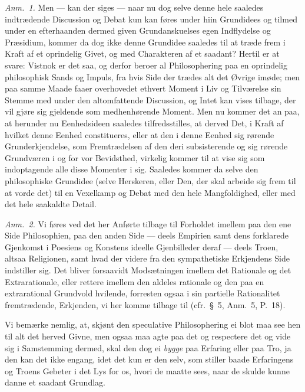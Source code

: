 \documentclass[12pt,a4paper]{book}
\newcommand{\apage}[1]{\marginnote{\footnotesize\textit{[#1]}}}
\begin{document}
{\small\emph{Anm.~1.} Men --- kan der siges --- naar nu dog selve denne hele saaledes
indtrædende Discussion og Debat kun kan føres under hiin Grundidees og tilmed under
en efterhaanden dermed given Grundanskuelses egen Indflydelse og Præsidium, kommer
da dog ikke denne Grundidee saaledes til at træde frem i Kraft af et oprindelig
Givet, og med Charakteren af et saadant? Hertil er at svare: Vistnok er det saa, og
derfor beroer al Philosophering paa en oprindelig philosophisk Sands og Impuls, fra
hvis Side der trædes alt det Øvrige imøde; men paa samme Maade faaer overhovedet
ethvert Moment i Liv og Tilværelse sin Stemme med under den altomfattende
Discussion, og Intet kan vises tilbage, der vil gjøre sig gjeldende som
medhenhørende Moment. Men nu kommer det an paa, at herunder nu Eenhedsideen saaledes
tilfredsstilles, at derved Det, i Kraft af hvilket denne Eenhed constitueres, eller
at den i denne Eenhed sig rørende Grunderkjendelse, som Fremtrædelsen af den deri
subsisterende og sig rørende Grundværen i og for vor Bevidsthed, virkelig kommer til
at vise sig som indoptagende alle disse Momenter i sig. Saaledes kommer da selve den
philosophiske Grundidee (selve Herskeren, eller Den, der skal arbeide sig frem til
at vorde det) til en Vexelkamp og Debat med den hele Mangfoldighed, eller med det
hele saakaldte Detail.\par}

{\small\emph{Anm.~2.} Vi føres ved det her Anførte tilbage til Forholdet imellem paa
den ene Side Philosophien, paa den anden Side --- deels Empirien samt dens forklarede
Gjenkomst i Poesiens og Konstens ideelle Gjenbilleder deraf --- deels Troen, altsaa
Religionen, samt hvad der videre fra den sympathetiske Erkjendens Side indstiller
sig. Det bliver forsaavidt Modsætningen imellem det Rationale og det Extrarationale,
eller rettere imellem den aldeles rationale og den paa en extrarational Grundvold
hvilende, forresten ogsaa i sin partielle Rationalitet fremtrædende, Erkjenden, vi
her komme tilbage til (cfr.\ \S~5, Anm.~5, P.\ 18).\par} \apage{65} 

Vi bemærke nemlig, at, skjønt den speculative Philosophering ei blot maa see hen til
alt det herved Givne, men ogsaa maa agte paa det og respectere det og vide sig i
Samstemming dermed, skal den dog ei \emph{bygge} paa Erfaring eller paa Tro, ja den
kan det ikke engang, idet det kun er den selv, som stiller baade Erfaringens og
Troens Gebeter i det Lys for os, hvori de maatte sees, naar de skulde kunne danne et
saadant Grundlag.
\end{document}
